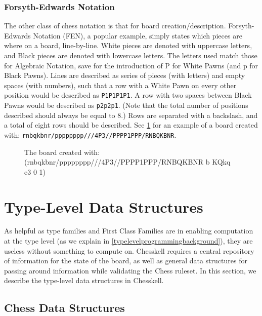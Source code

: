 \subsubsection{Forsyth-Edwards Notation} \label{fensection}

The other class of chess notation is that for board creation/description. Forsyth-Edwards Notation (FEN), a popular example, simply states which pieces are where on a board, line-by-line. White pieces are denoted with uppercase letters, and Black pieces are denoted with lowercase letters. The letters used match those for Algebraic Notation, save for the introduction of P for White Pawns (and p for Black Pawns). Lines are described as series of pieces (with letters) and empty spaces (with numbers), such that a row with a White Pawn on every other position would be described as \texttt{P1P1P1P1}. A row with two spaces between Black Pawns would be described as \texttt{p2p2p1}. (Note that the total number of positions described should always be equal to 8.) Rows are separated with a backslash, and a total of eight rows should be described. See \cref{fenexample} for an example of a board created with: \texttt{rnbqkbnr/\-pppppppp///\-4P3//\-PPPP1PPP/\-RNBQKBNR}.

\begin{figure}[h]
    \centering
    \showboard
    \caption{The board created with: (rnbqkbnr/\-pppppppp///\-4P3//\-PPPP1PPP/\-RNBQKBNR b KQkq e3 0 1)}
    \label{fenexample}
\end{figure}

\section{Type-Level Data Structures}

As helpful as type families and First Class Families are in enabling computation at the type level (as we explain in \cref{typelevelprogrammingbackground}), they are useless without something to compute on. Chesskell requires a central repository of information for the state of the board, as well as general data structures for passing around information while validating the Chess ruleset. In this section, we describe the type-level data structures in Chesskell.

\subsection{Chess Data Structures}

